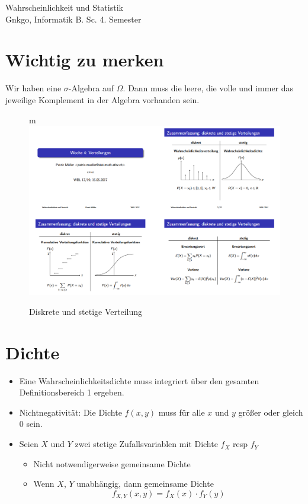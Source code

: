 \documentclass{article}
\begin{document}
\begin{titlepage}
    \thispagestyle{fancy}
    \renewcommand{\headrulewidth}{1pt}

    \center
    \vspace*{1.0cm}
    \Large Wahrscheinlichkeit und Statistik \\[.5 cm]
    \large
    \normalsize
    Gnkgo, Informatik B. Sc. 4. Semester \\
    \vfill
\end{titlepage}



\tableofcontents
\newpage

\section{Wichtig zu merken}

Wir haben eine $\sigma$-Algebra auf $\Omega$. Dann muss die leere, die volle und immer das jeweilige Komplement in der Algebra vorhanden sein.

\begin{figure}[h]m
    \centering
    \includegraphics[width=0.7\linewidth]{Source/assets/diskrete_stetige_verteilung.png}
    \caption{Diskrete und stetige Verteilung}
\end{figure}

\section{Dichte}
\begin{itemize}
    \item Eine Wahrscheinlichkeitsdichte muss integriert über den gesamten Definitionsbereich 1 ergeben.
    \item Nichtnegativität: Die Dichte $f(x, y)$ muss für alle $x$ und $y$ größer oder gleich 0 sein.
    \item Seien $X$ und $Y$ zwei stetige Zufallsvariablen mit Dichte $f_X$ resp $f_Y$
    \begin{itemize}
        \item Nicht notwendigerweise gemeinsame Dichte
        \item Wenn $X$, $Y$ unabhängig, dann gemeinsame Dichte
        $$f_{X, Y}(x, y) = f_X(x) \cdot f_Y(y)$$
    \end{itemize}
\end{itemize}
\end{document}
